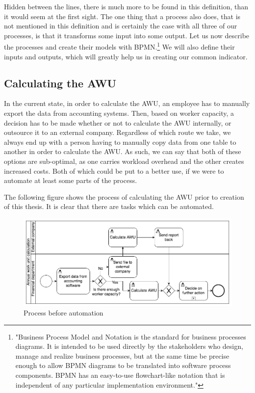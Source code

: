 \documentclass[12pt,oneside]{fithesis2}
\begin{document}
\par
Hidden between the lines, there is much more to be found in this definition, than it would seem at the first sight. The one thing that a process also does, that is not mentioned in this definition and is certainly the case with all three of our processes, is that it transforms some input into some output. Let us now describe the processes and create their models with BPMN.\footnote{"Business Process Model and Notation is the standard for business processes diagrams. It is intended to be used directly by the stakeholders who design, manage and realize business processes, but at the same time be precise enough to allow BPMN diagrams to be translated into software process components. BPMN has an easy-to-use flowchart-like notation that is independent of any particular implementation environment."\cite{bpmn}} We will also define their inputs and outputs, which will greatly help us in creating our common indicator.
\newpage
\subsection{Calculating the AWU}
In the current state, in order to calculate the AWU, an employee has to manually export the data from accounting systems. Then, based on worker capacity, a decision has to be made whether or not to calculate the AWU internally, or outsource it to an external company. Regardless of which route we take, we always end up with a person having to manually copy data from one table to another in order to calculate the AWU. As such, we can say that both of these options are sub-optimal, as one carries workload overhead and the other creates increased costs. Both of which could be put to a better use, if we were to automate at least some parts of the process.

The following figure shows the process of calculating the AWU prior to creation of this thesis. It is clear that there are tasks which can be automated.
\begin{figure}[htp]
    \centering
    \includegraphics[width=\textwidth]{before_automation.png}
    \caption{Process before automation}
    \label{fig:before_automation}
\end{figure}
\end{document}
